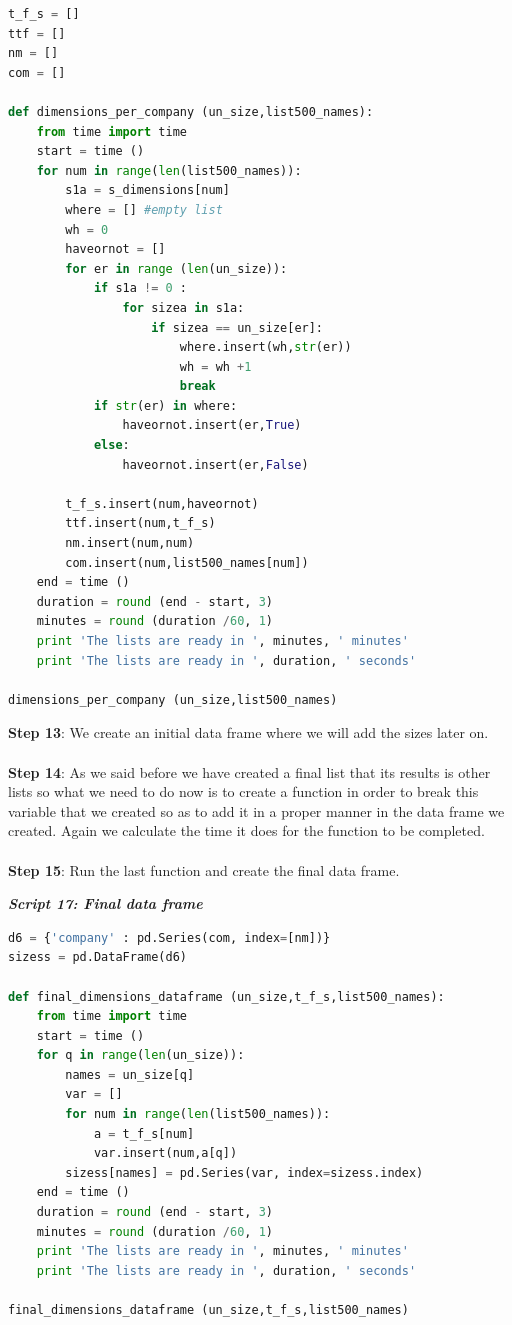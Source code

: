 \documentclass{article}
\begin{document}
\begin{lstlisting}[language=Python]
t_f_s = []
ttf = []
nm = []
com = []

def dimensions_per_company (un_size,list500_names):
    from time import time     
    start = time ()
    for num in range(len(list500_names)): 
        s1a = s_dimensions[num] 
        where = [] #empty list
        wh = 0
        haveornot = []
        for er in range (len(un_size)):
            if s1a != 0 :
                for sizea in s1a:
                    if sizea == un_size[er]:
                        where.insert(wh,str(er))
                        wh = wh +1
                        break
            if str(er) in where:
                haveornot.insert(er,True)                    
            else:
                haveornot.insert(er,False)
                    
        t_f_s.insert(num,haveornot)
        ttf.insert(num,t_f_s)
        nm.insert(num,num)
        com.insert(num,list500_names[num])
    end = time ()
    duration = round (end - start, 3)
    minutes = round (duration /60, 1)
    print 'The lists are ready in ', minutes, ' minutes'
    print 'The lists are ready in ', duration, ' seconds'

dimensions_per_company (un_size,list500_names)
\end{lstlisting}
\textbf{Step 13}: We create an initial data frame where we will add the sizes later on.\\\\
\textbf{Step 14}: As we said before we have created a final list that its results is other lists so what we need to do now is to create a function in order to break this variable that we created so as to add it in a proper manner in the data frame we created. Again we calculate the time it does for the function to be completed.\\\\
\textbf{Step 15}: Run the last function and create the final data frame.                    
\begin{center}
\textit{\textbf{Script 17: Final data frame }}
\end{center}
\begin{lstlisting}[language=Python]
d6 = {'company' : pd.Series(com, index=[nm])}
sizess = pd.DataFrame(d6)   

def final_dimensions_dataframe (un_size,t_f_s,list500_names):
    from time import time 
    start = time ()
    for q in range(len(un_size)):
        names = un_size[q]
        var = []
        for num in range(len(list500_names)):
            a = t_f_s[num]
            var.insert(num,a[q])
        sizess[names] = pd.Series(var, index=sizess.index) 
    end = time ()
    duration = round (end - start, 3)
    minutes = round (duration /60, 1)
    print 'The lists are ready in ', minutes, ' minutes'
    print 'The lists are ready in ', duration, ' seconds'

final_dimensions_dataframe (un_size,t_f_s,list500_names)
\end{lstlisting}
\end{document}
